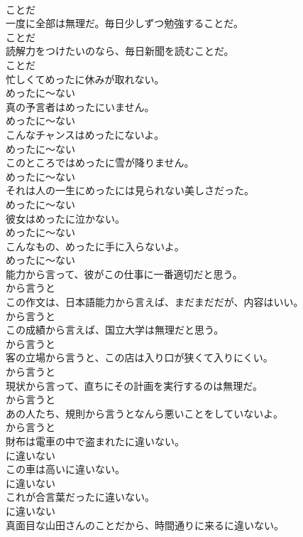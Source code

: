 \documentclass[8pt]{extreport}
\begin{document}
\begin{CJK}{UTF8}{min}
\\	ことだ
\\	一度に全部は無理だ。毎日少しずつ勉強することだ。	
\\	ことだ
\\	読解力をつけたいのなら、毎日新聞を読むことだ。	
\\	ことだ
\\	忙しくてめったに休みが取れない。	
\\	めったに～ない
\\	真の予言者はめったにいません。	
\\	めったに～ない
\\	こんなチャンスはめったにないよ。	
\\	めったに～ない
\\	このところではめったに雪が降りません。	
\\	めったに～ない
\\	それは人の一生にめったには見られない美しさだった。	
\\	めったに～ない
\\	彼女はめったに泣かない。	
\\	めったに～ない
\\	こんなもの、めったに手に入らないよ。	
\\	めったに～ない
\\	能力から言って、彼がこの仕事に一番適切だと思う。	
\\	から言うと
\\	この作文は、日本語能力から言えば、まだまだだが、内容はいい。	
\\	から言うと
\\	この成績から言えば、国立大学は無理だと思う。	
\\	から言うと
\\	客の立場から言うと、この店は入り口が狭くて入りにくい。	
\\	から言うと
\\	現状から言って、直ちにその計画を実行するのは無理だ。	
\\	から言うと
\\	あの人たち、規則から言うとなんら悪いことをしていないよ。	
\\	から言うと
\\	財布は電車の中で盗まれたに違いない。	
\\	に違いない
\\	この車は高いに違いない。	
\\	に違いない
\\	これが合言葉だったに違いない。	
\\	に違いない
\\	真面目な山田さんのことだから、時間通りに来るに違いない。	

\end{CJK}
\end{document}
